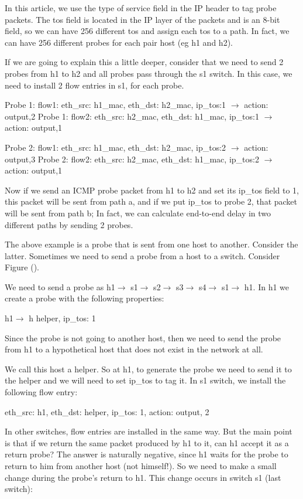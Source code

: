 \documentclass[10pt, journal, letterpaper]{IEEEtran}
\begin{document}
In this article, we use the type of service field in the IP header to tag probe packets. The tos field is located in the IP layer of the packets and is an 8-bit field, so we can have 256 different tos and assign each tos to a path. In fact, we can have 256 different probes for each pair host (eg h1 and h2).

If we are going to explain this a little deeper, consider that we need to send 2 probes from h1 to h2 and all probes pass through the s1 switch. In this case, we need to install 2 flow entries in s1, for each probe.

Probe 1: flow1: eth_src: h1_mac, eth_dst: h2_mac, ip_tos:1 $\rightarrow$ action: output,2
Probe 1: flow2: eth_src: h2_mac, eth_dst: h1_mac, ip_tos:1 $\rightarrow$ action: output,1

Probe 2: flow1: eth_src: h1_mac, eth_dst: h2_mac, ip_tos:2 $\rightarrow$ action: output,3
Probe 2: flow2: eth_src: h2_mac, eth_dst: h1_mac, ip_tos:2 $\rightarrow$ action: output,1

Now if we send an ICMP probe packet from h1 to h2 and set its ip_tos field to 1, this packet will be sent from path a, and if we put ip_tos to probe 2, that packet will be sent from path b; In fact, we can calculate end-to-end delay in two different paths by sending 2 probes. 

The above example is a probe that is sent from one host to another. Consider the latter. Sometimes we need to send a probe from a host to a switch. Consider Figure ().

We need to send a probe as h1$\rightarrow$ s1$\rightarrow$ s2$\rightarrow$ s3$\rightarrow$ s4$\rightarrow$ s1$\rightarrow$ h1. In h1 we create a probe with the following properties:

h1$\rightarrow$ h helper, ip\_tos: 1

Since the probe is not going to another host, then we need to send the probe from h1 to a hypothetical host that does not exist in the network at all. 

We call this host a helper. So at h1, to generate the probe we need to send it to the helper and we will need to set ip\_tos to tag it. In s1 switch, we install the following flow entry:

eth\_src: h1, eth\_dst: helper, ip\_tos: 1, action: output, 2

In other switches, flow entries are installed in the same way. But the main point is that if we return the same packet produced by h1 to it, can h1 accept it as a return probe? The answer is naturally negative, since h1 waits for the probe to return to him from another host (not himself!). So we need to make a small change during the probe's return to h1. This change occurs in switch s1 (last switch):
\end{document}
